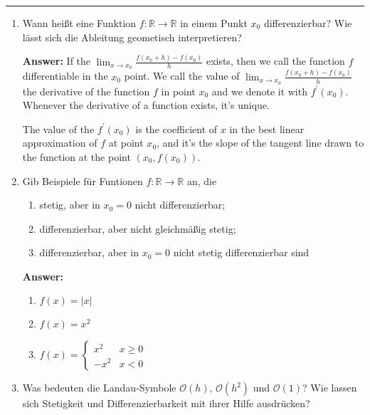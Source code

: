 \documentclass[11pt]{article}
\newcommand{\abs}[1]{\left|#1\right|}
\newcommand{\RR}[0]{\mathbb{R}}
\newcommand{\smallo}[0]{{\scriptstyle \mathcal{O}}}
\begin{document}


\medskip\hrule
\begin{enumerate}
    \item Wann heißt eine Funktion $f\colon \RR\to\RR$ in einem Punkt $x_0$ differenzierbar? Wie lässt sich die Ableitung geometisch interpretieren?
    
    \textbf{Answer:}
    If the $\lim_{x\to x_0}\frac{f(x_0 + h) - f(x_0)}{h}$ exists, then we call the function $f$ differentiable in the $x_0$ point. We call the value of $\lim_{x\to x_0}\frac{f(x_0 + h) - f(x_0)}{h}$ the derivative of the function $f$ in point $x_0$ and we denote it with $f^\prime(x_0)$. Whenever the derivative of a function exists, it's unique.

    The value of the $f^\prime(x_0)$ is the coefficient of $x$ in the best linear approximation of $f$ at point $x_0$, and it's the slope of the tangent line drawn to the function at the point $(x_0, f(x_0))$.

    \item  Gib Beispiele für Funtionen $f\colon \RR\to\RR$ an, die
    \begin{enumerate}
        \item stetig, aber in $x_0 = 0$ nicht differenzierbar;
        \item differenzierbar, aber nicht gleichmäßig stetig;
        \item differenzierbar, aber in $x_0 = 0$ nicht stetig differenzierbar sind
    \end{enumerate}

    \textbf{Answer:}

    \begin{enumerate}
        \item $f(x) = \abs{x}$
        \item $f(x) = x^2$
        \item $f(x) = \begin{cases}
            x^2&x\ge0\\
            -x^2&x<0
        \end{cases}$
    \end{enumerate}

    \item Was bedeuten die Landau-Symbole $\smallo(h)$, $\mathcal{O}(h^2)$ und ${ \scriptstyle \mathcal{O}}(1)$? Wie lassen sich Stetigkeit und Differenzierbarkeit mit ihrer Hilfe ausdrücken?
    

\end{enumerate}
\end{document}

